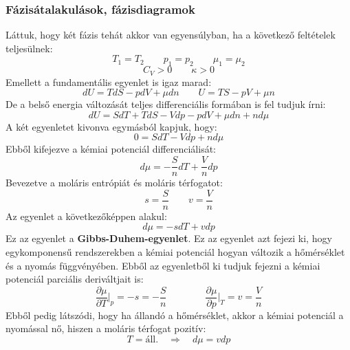 \documentclass[a4paper,12pt]{article}
\begin{document}
\subsubsection{Fázisátalakulások, fázisdiagramok}
Láttuk, hogy két fázis tehát akkor van egyensúlyban, ha a következő feltételek teljesülnek:
\begin{equation}
    T_1 = T_2 \qquad p_1 = p_2 \qquad \mu_1 = \mu_2
\end{equation}
\begin{equation}
   C_{V} > 0 \qquad \kappa > 0
\end{equation}
Emellett a fundamentális egyenlet is igaz marad:
\begin{equation}
    dU = T dS - p dV + \mu dn \qquad U = TS - pV + \mu n
\end{equation}
De a belső energia változását teljes differenciális formában is fel tudjuk írni:
\begin{equation}
    dU = SdT + TdS - Vdp - pdV + \mu dn + n d\mu
\end{equation}
A két egyenletet kivonva egymásból kapjuk, hogy:
\begin{equation}
    0 = SdT - Vdp + n d\mu
\end{equation}
Ebből kifejezve a kémiai potenciál differenciálisát:
\begin{equation}
    d\mu = - \frac{S}{n} dT + \frac{V}{n} dp
\end{equation}
Bevezetve a moláris entrópiát és moláris térfogatot:
\begin{equation}
    s = \frac{S}{n} \qquad v = \frac{V}{n}
\end{equation}
Az egyenlet a következőképpen alakul:
\begin{equation}
    d\mu = - s dT + v dp
\end{equation}
Ez az egyenlet a \textbf{Gibbs-Duhem-egyenlet}. Ez az egyenlet azt fejezi ki, hogy egykomponensű rendszerekben a kémiai potenciál hogyan változik a hőmérséklet és
a nyomás függvényében. Ebből az egyenletből ki tudjuk fejezni a kémiai potenciál parciális deriváltjait is:
\begin{equation}
    \frac{\partial \mu}{\partial T}\bigg|_{p} = - s = - \frac{S}{n} \qquad \qquad \frac{\partial \mu}{\partial p}\bigg|_{T} = v = \frac{V}{n}
\end{equation}
Ebből pedig látszódi, hogy ha állandó a hőmérséklet, akkor a kémiai potenciál a nyomással nő, hiszen a moláris térfogat pozitív:
\begin{equation}
    T = \text{áll.} \quad \Rightarrow \quad d\mu = vdp
\end{equation}
\end{document}
